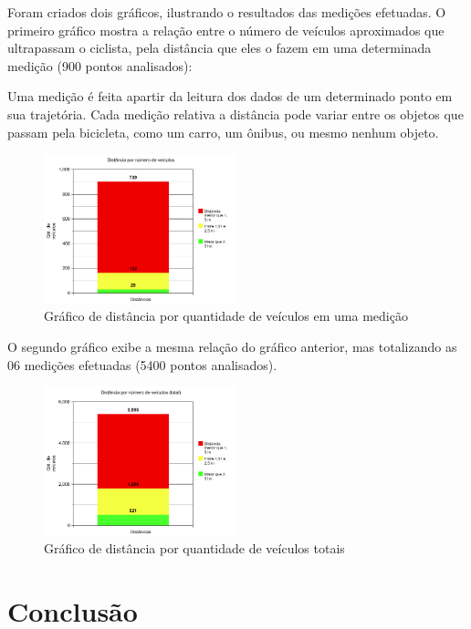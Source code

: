 \documentclass[final,12pt, times, 5p, twocolumn]{elsarticle}
\begin{document}
Foram criados dois gráficos, ilustrando o resultados das medições efetuadas. O primeiro gráfico mostra a relação entre o número de veículos aproximados que ultrapassam o ciclista, pela distância que eles o fazem em uma determinada medição (900 pontos analisados):

Uma medição é feita apartir da leitura dos dados de um determinado ponto em sua trajetória. Cada medição relativa a distância pode variar entre os objetos que passam pela bicicleta, como um carro, um ônibus, ou mesmo nenhum objeto. 

\begin{figure}[ht!]
\centering
\includegraphics[width=0.5\textwidth]{graph1.png}
\caption{\label{fig:graph1}Gráfico de distância por quantidade de veículos em uma medição}
\end{figure}

O segundo gráfico exibe a mesma relação do gráfico anterior, mas totalizando as 06 medições efetuadas (5400 pontos analisados).

\begin{figure}[ht!]
\centering
\includegraphics[width=0.5\textwidth]{graph2.png}
\caption{\label{fig:graph2}Gráfico de distância por quantidade de veículos totais}
\end{figure}

\section{Conclusão}
\end{document}

